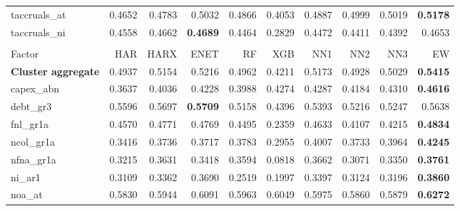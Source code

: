 \begin{longtable}{>{\raggedright\arraybackslash}p{2.6cm}rrrrrrrrr}
taccruals\_at & 0.4652 & \cellcolor{blue!10}0.4783 & \cellcolor{blue!10}0.5032 & \cellcolor{blue!10}0.4866 & 0.4053 & \cellcolor{blue!10}0.4887 & \cellcolor{blue!10}0.4999 & \cellcolor{blue!10}0.5019 & \textbf{\cellcolor{blue!10}0.5178} \\
taccruals\_ni & 0.4558 & \cellcolor{blue!10}0.4662 & \textbf{\cellcolor{blue!10}0.4689} & 0.4464 & 0.2829 & 0.4472 & 0.4411 & 0.4392 & \cellcolor{blue!10}0.4653 \\
\hline
\multicolumn{10}{@{}l}{\textit{Panel B. Debt Issuance}} \\
\hline
Factor & HAR & HARX & ENET & RF & XGB & NN1 & NN2 & NN3 & EW \\
\hline
\textbf{Cluster aggregate} & 0.4937 & \cellcolor{blue!10}0.5154 & \cellcolor{blue!10}0.5216 & \cellcolor{blue!10}0.4962 & 0.4211 & \cellcolor{blue!10}0.5173 & 0.4928 & \cellcolor{blue!10}0.5029 & \textbf{\cellcolor{blue!10}0.5415} \\
capex\_abn & 0.3637 & \cellcolor{blue!10}0.4036 & \cellcolor{blue!10}0.4228 & \cellcolor{blue!10}0.3988 & \cellcolor{blue!10}0.4274 & \cellcolor{blue!10}0.4287 & \cellcolor{blue!10}0.4184 & \cellcolor{blue!10}0.4310 & \textbf{\cellcolor{blue!10}0.4616} \\
debt\_gr3 & 0.5596 & \cellcolor{blue!10}0.5697 & \textbf{\cellcolor{blue!10}0.5709} & 0.5158 & 0.4396 & 0.5393 & 0.5216 & 0.5247 & \cellcolor{blue!10}0.5638 \\
fnl\_gr1a & 0.4570 & \cellcolor{blue!10}0.4771 & \cellcolor{blue!10}0.4769 & 0.4495 & 0.2359 & \cellcolor{blue!10}0.4633 & 0.4107 & 0.4215 & \textbf{\cellcolor{blue!10}0.4834} \\
ncol\_gr1a & 0.3416 & \cellcolor{blue!10}0.3736 & \cellcolor{blue!10}0.3717 & \cellcolor{blue!10}0.3783 & 0.2955 & \cellcolor{blue!10}0.4007 & \cellcolor{blue!10}0.3733 & \cellcolor{blue!10}0.3964 & \textbf{\cellcolor{blue!10}0.4245} \\
nfna\_gr1a & 0.3215 & \cellcolor{blue!10}0.3631 & \cellcolor{blue!10}0.3418 & \cellcolor{blue!10}0.3594 & 0.0818 & \cellcolor{blue!10}0.3662 & 0.3071 & \cellcolor{blue!10}0.3350 & \textbf{\cellcolor{blue!10}0.3761} \\
ni\_ar1 & 0.3109 & \cellcolor{blue!10}0.3362 & \cellcolor{blue!10}0.3690 & 0.2519 & 0.1997 & \cellcolor{blue!10}0.3397 & \cellcolor{blue!10}0.3124 & \cellcolor{blue!10}0.3196 & \textbf{\cellcolor{blue!10}0.3860} \\
noa\_at & 0.5830 & \cellcolor{blue!10}0.5944 & \cellcolor{blue!10}0.6091 & \cellcolor{blue!10}0.5963 & \cellcolor{blue!10}0.6049 & \cellcolor{blue!10}0.5975 & \cellcolor{blue!10}0.5860 & \cellcolor{blue!10}0.5879 & \textbf{\cellcolor{blue!10}0.6272} \\

\end{longtable}
